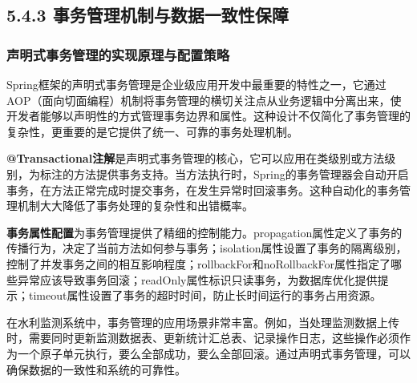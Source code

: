 \subsection{5.4.3 事务管理机制与数据一致性保障}\label{ux4e8bux52a1ux7ba1ux7406ux673aux5236ux4e0eux6570ux636eux4e00ux81f4ux6027ux4fddux969c}

\subsubsection{声明式事务管理的实现原理与配置策略}\label{ux58f0ux660eux5f0fux4e8bux52a1ux7ba1ux7406ux7684ux5b9eux73b0ux539fux7406ux4e0eux914dux7f6eux7b56ux7565}

Spring框架的声明式事务管理是企业级应用开发中最重要的特性之一，它通过AOP（面向切面编程）机制将事务管理的横切关注点从业务逻辑中分离出来，使开发者能够以声明性的方式管理事务边界和属性。这种设计不仅简化了事务管理的复杂性，更重要的是它提供了统一、可靠的事务处理机制。

\textbf{@Transactional注解}是声明式事务管理的核心，它可以应用在类级别或方法级别，为标注的方法提供事务支持。当方法执行时，Spring的事务管理器会自动开启事务，在方法正常完成时提交事务，在发生异常时回滚事务。这种自动化的事务管理机制大大降低了事务处理的复杂性和出错概率。

\textbf{事务属性配置}为事务管理提供了精细的控制能力。propagation属性定义了事务的传播行为，决定了当前方法如何参与事务；isolation属性设置了事务的隔离级别，控制了并发事务之间的相互影响程度；rollbackFor和noRollbackFor属性指定了哪些异常应该导致事务回滚；readOnly属性标识只读事务，为数据库优化提供提示；timeout属性设置了事务的超时时间，防止长时间运行的事务占用资源。

在水利监测系统中，事务管理的应用场景非常丰富。例如，当处理监测数据上传时，需要同时更新监测数据表、更新统计汇总表、记录操作日志，这些操作必须作为一个原子单元执行，要么全部成功，要么全部回滚。通过声明式事务管理，可以确保数据的一致性和系统的可靠性。

